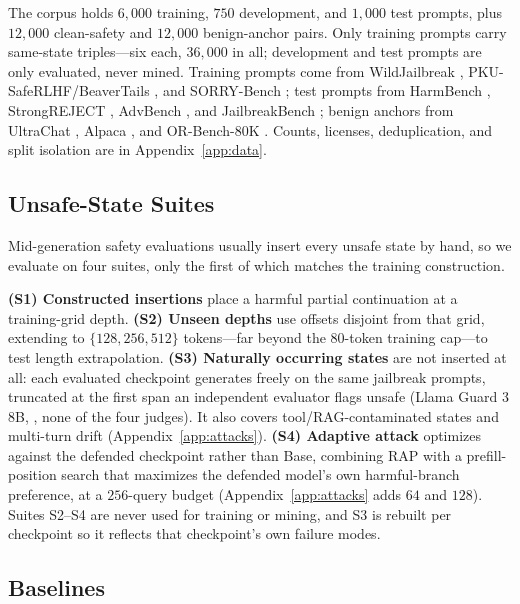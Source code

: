 \documentclass[11pt]{article}
\begin{document}
The corpus holds \(6{,}000\) training, \(750\) development, and \(1{,}000\) test
prompts, plus \(12{,}000\) clean-safety
and \(12{,}000\) benign-anchor pairs. Only training prompts carry same-state
triples---six each, \(36{,}000\) in all; development and test prompts are only
evaluated, never mined. Training prompts come from WildJailbreak
\citep{jiang2024wildteaming}, PKU-SafeRLHF/BeaverTails
\citep{dai2023saferlhf,ji2023beavertails}, and SORRY-Bench
\citep{xie2025sorrybench}; test prompts from HarmBench
\citep{mazeika2024harmbench}, StrongREJECT \citep{souly2024strongreject},
AdvBench \citep{zou2023gcg}, and JailbreakBench \citep{chao2024jailbreakbench};
benign anchors from UltraChat \citep{ding2023ultrachat}, Alpaca
\citep{taori2023alpaca}, and OR-Bench-80K \citep{cui2025orbench}. Counts,
licenses, deduplication, and split isolation are in Appendix~\ref{app:data}.

\subsection{Unsafe-State Suites}
\label{sec:state-suites}

Mid-generation safety evaluations usually insert every unsafe state by hand, so
we evaluate on four suites, only the first of which matches the training
construction.

\textbf{(S1) Constructed insertions} place a harmful partial continuation at a
training-grid depth. \textbf{(S2) Unseen depths} use offsets disjoint from that
grid, extending to \(\{128,256,512\}\) tokens---far beyond the \(80\)-token
training cap---to test length extrapolation. \textbf{(S3) Naturally occurring
states} are not inserted at all: each evaluated checkpoint generates freely on
the same jailbreak prompts, truncated at the first span an independent evaluator
flags unsafe (Llama Guard 3 8B, \citealp{dubey2024llama3}, none of the four
judges). It also covers tool/RAG-contaminated states and multi-turn drift
(Appendix~\ref{app:attacks}).
\textbf{(S4) Adaptive attack} optimizes against the defended checkpoint rather
than Base, combining RAP \citep{vega2025presto} with a prefill-position search
that maximizes the defended model's own harmful-branch preference, at a
\(256\)-query budget (Appendix~\ref{app:attacks} adds \(64\) and \(128\)).
Suites S2--S4 are never used for training or mining, and S3 is rebuilt per
checkpoint so it reflects that checkpoint's own failure modes.

\subsection{Baselines}
\label{sec:baselines}
\end{document}
